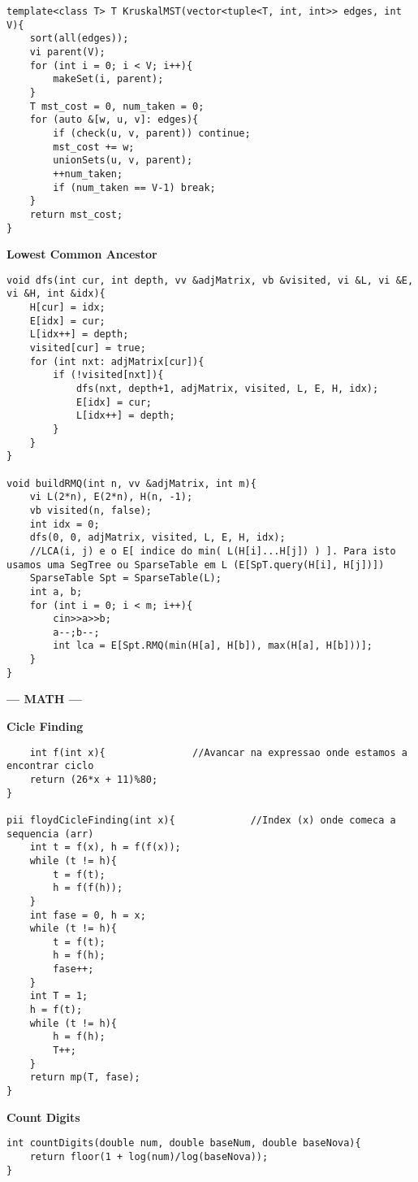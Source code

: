 \documentclass{article}
\begin{document}
\begin{multicols}{2}
\begin{lstlisting}
template<class T> T KruskalMST(vector<tuple<T, int, int>> edges, int V){
	sort(all(edges));
	vi parent(V);
	for (int i = 0; i < V; i++){
		makeSet(i, parent);
	}
	T mst_cost = 0, num_taken = 0;
	for (auto &[w, u, v]: edges){
		if (check(u, v, parent)) continue;
		mst_cost += w;
		unionSets(u, v, parent);
		++num_taken;
		if (num_taken == V-1) break;
	}
	return mst_cost;
}

\end{lstlisting}

\large
\huge\textbf{Lowest Common Ancestor}
\large
\begin{lstlisting}
void dfs(int cur, int depth, vv &adjMatrix, vb &visited, vi &L, vi &E, vi &H, int &idx){
	H[cur] = idx;
	E[idx] = cur;
	L[idx++] = depth;
	visited[cur] = true;
	for (int nxt: adjMatrix[cur]){
		if (!visited[nxt]){
			dfs(nxt, depth+1, adjMatrix, visited, L, E, H, idx);
			E[idx] = cur;
			L[idx++] = depth;
		}
	}
}

void buildRMQ(int n, vv &adjMatrix, int m){
	vi L(2*n), E(2*n), H(n, -1);
	vb visited(n, false);
	int idx = 0;
	dfs(0, 0, adjMatrix, visited, L, E, H, idx);
	//LCA(i, j) e o E[ indice do min( L(H[i]...H[j]) ) ]. Para isto usamos uma SegTree ou SparseTable em L (E[SpT.query(H[i], H[j])])
	SparseTable Spt = SparseTable(L);
	int a, b;
	for (int i = 0; i < m; i++){
		cin>>a>>b;
		a--;b--;
		int lca = E[Spt.RMQ(min(H[a], H[b]), max(H[a], H[b]))];
	}
}

\end{lstlisting}


\large
\begin{center}
\huge\textbf{--- MATH ---}
\end{center}
\large

\large
\huge\textbf{Cicle Finding}
\large
\begin{lstlisting}
	int f(int x){               //Avancar na expressao onde estamos a encontrar ciclo
	return (26*x + 11)%80;
}

pii floydCicleFinding(int x){             //Index (x) onde comeca a sequencia (arr)
	int t = f(x), h = f(f(x));
	while (t != h){
		t = f(t);
		h = f(f(h));
	}
	int fase = 0, h = x;
	while (t != h){
		t = f(t);
		h = f(h);
		fase++;
	}
	int T = 1;
	h = f(t);
	while (t != h){
		h = f(h);
		T++;
	}
	return mp(T, fase);
}
\end{lstlisting}

\large
\huge\textbf{Count Digits}
\large
\begin{lstlisting}
int countDigits(double num, double baseNum, double baseNova){
	return floor(1 + log(num)/log(baseNova));
}	
\end{lstlisting}


\end{multicols}
\end{document}
